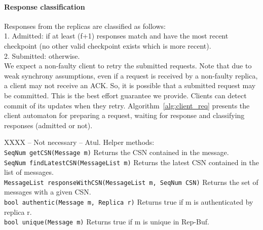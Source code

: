 \documentclass[twocolumn,10pt]{article}
\begin{document}
{\paragraph{Response classification} 
Responses from the replicas are classified as follows:\\
1. Admitted: if at least (f+1) responses match and have the most 
recent checkpoint (no other valid checkpoint exists which is 
more recent).\\
2. Submitted: otherwise.\\


We expect a non-faulty client to retry the submitted requests. Note that
due to weak synchrony assumptions, even if a request is received by 
a non-faulty replica, a client may not receive an ACK. So, it is possible
that a submitted request may be committed. This is the best effort
guarantee we provide. Clients can detect commit of its updates when
they retry. Algorithm~\ref{alg:client_req} presents the client automaton
for preparing a request, waiting for response and classifying responses
(admitted or not).

XXXX -- Not necessary -- Atul.
Helper methods:\\
\texttt{SeqNum getCSN(Message m)} Returns the CSN contained in the message.\\
\texttt{SeqNum findLatestCSN(MessageList m)} Returns the latest CSN contained 
in the list of messages.\\
\texttt{MessageList responseWithCSN(MessageList m, SeqNum CSN)} Returns the 
set of messages with a given CSN.\\
\texttt{bool authentic(Message m, Replica r)} Returns true if m is authenticated
by replica r.\\
\texttt{bool unique(Message m)} Returns true if m is unique in Rep-Buf.\\
\fi

}
\end{document}
